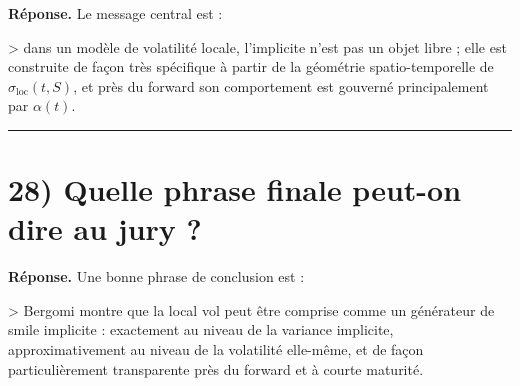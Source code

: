 \documentclass[11pt,a4paper]{article}
\begin{document}
\textbf{Réponse.}  
Le message central est :

> dans un modèle de volatilité locale, l’implicite n’est pas un objet libre ; elle est construite de façon très spécifique à partir de la géométrie spatio-temporelle de \(\sigma_{\mathrm{loc}}(t,S)\), et près du forward son comportement est gouverné principalement par \(\alpha(t)\).

\bigskip\hrule\bigskip

\section{28) Quelle phrase finale peut-on dire au jury ?}

\textbf{Réponse.}  
Une bonne phrase de conclusion est :

> Bergomi montre que la local vol peut être comprise comme un générateur de smile implicite : exactement au niveau de la variance implicite, approximativement au niveau de la volatilité elle-même, et de façon particulièrement transparente près du forward et à courte maturité.
\end{document}

